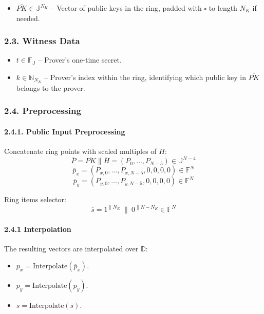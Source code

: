 \documentclass[
]{article}
\providecommand{\tightlist}{%
  \setlength{\itemsep}{0pt}\setlength{\parskip}{0pt}}
\begin{document}
\begin{itemize}
\tightlist
\item
  \(\overline{PK} \in \mathbb{J}^{N_K}\) -- Vector of public keys in the
  ring, padded with \(\square\) to length \(N_K\) if needed.
\end{itemize}

\hypertarget{witness-data}{%
\subsubsection{2.3. Witness Data}\label{witness-data}}

\begin{itemize}
\tightlist
\item
  \(t \in \mathbb{F_J}\) -- Prover's one-time secret.
\item
  \(k \in \mathbb{N}_{N_K}\) -- Prover's index within the ring,
  identifying which public key in \(\overline{PK}\) belongs to the
  prover.
\end{itemize}

\hypertarget{preprocessing}{%
\subsubsection{2.4. Preprocessing}\label{preprocessing}}

\hypertarget{public-input-preprocessing}{%
\paragraph{2.4.1. Public Input
Preprocessing}\label{public-input-preprocessing}}

Concatenate ring points with scaled multiples of \(H\):
\[\overline{P} = \overline{PK} \| \overline{H} = (P_0, \ldots, P_{N-5}) \in \mathbb{J}^{N-4}\]
\[\overline{p}_x = (P_{x,0}, \ldots, P_{x,N-5}, 0, 0, 0, 0) \in \mathbb{F}^N\]
\[\overline{p}_y = (P_{y,0}, \ldots, P_{y,N-5}, 0, 0, 0, 0) \in \mathbb{F}^N\]

Ring items selector:
\[\overline{s} = 1^{\|N_K}\ \|\ 0^{\|N-N_K} \in \mathbb{F}^N\]

\hypertarget{interpolation}{%
\paragraph{2.4.1 Interpolation}\label{interpolation}}

The resulting vectors are interpolated over \(\mathbb{D}\):

\begin{itemize}
\tightlist
\item
  \(p_x = \text{Interpolate}(\overline{p}_x)\).
\item
  \(p_y = \text{Interpolate}(\overline{p}_y)\).
\item
  \(s = \text{Interpolate}(\overline{s})\).
\end{itemize}
\end{document}
